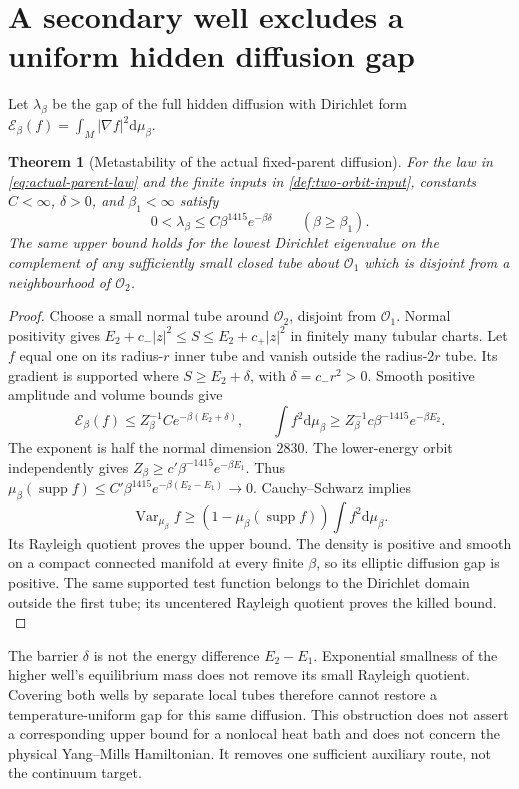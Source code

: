 \documentclass[11pt,oneside,openany]{book}
\newtheorem{theorem}{Theorem}[chapter]
\theoremstyle{definition}
\theoremstyle{remark}
\newcommand{\dd}{\mathrm d}
\newcommand{\Var}{\operatorname{Var}}
\newcommand{\supp}{\operatorname{supp}}
\newcommand{\src}[2]{\cite[#2]{#1}}
\begin{document}
\section{A secondary well excludes a uniform hidden diffusion gap}
\label{sec:hidden-metastability}
Let $\lambda_\beta$ be the gap of the full hidden diffusion with
Dirichlet form
$\mathcal E_\beta(f)=\int_M|\nabla f|^2\dd\mu_\beta$.

\begin{theorem}[Metastability of the actual fixed-parent diffusion]
\label{thm:hidden-metastability}
For the law in \cref{eq:actual-parent-law} and the finite inputs in
\cref{def:two-orbit-input}, constants $C<\infty$, $\delta>0$, and
$\beta_1<\infty$ satisfy
\begin{equation}\label{eq:hidden-metastability}
 0<\lambda_\beta\le C\beta^{1415}e^{-\beta\delta}
                   \qquad(\beta\ge\beta_1).
\end{equation}
The same upper bound holds for the lowest Dirichlet eigenvalue on the
complement of any sufficiently small closed tube about $\mathcal O_1$
which is disjoint from a neighbourhood of $\mathcal O_2$.
\end{theorem}
\begin{proof}
Choose a small normal tube around $\mathcal O_2$, disjoint from
$\mathcal O_1$. Normal positivity gives
$E_2+c_-|z|^2\le S\le E_2+c_+|z|^2$ in finitely many tubular
charts. Let $f$ equal one on its radius-$r$ inner tube and vanish
outside the radius-$2r$ tube. Its gradient is supported where
$S\ge E_2+\delta$, with $\delta=c_-r^2>0$. Smooth positive amplitude
and volume bounds give
\[
 \mathcal E_\beta(f)\le Z_\beta^{-1}C e^{-\beta(E_2+\delta)},\qquad
 \int f^2\dd\mu_\beta\ge Z_\beta^{-1}c\beta^{-1415}e^{-\beta E_2}.
\]
The exponent is half the normal dimension $2830$. The lower-energy
orbit independently gives
$Z_\beta\ge c'\beta^{-1415}e^{-\beta E_1}$. Thus
$\mu_\beta(\supp f)\le C'\beta^{1415}e^{-\beta(E_2-E_1)}\to0$.
Cauchy--Schwarz implies
\[
 \Var_{\mu_\beta}f\ge(1-\mu_\beta(\supp f))\int f^2\dd\mu_\beta.
\]
Its Rayleigh quotient proves the upper bound. The density is positive
and smooth on a compact connected manifold at every finite $\beta$,
so its elliptic diffusion gap is positive. The same supported test
function belongs to the Dirichlet domain outside the first tube;
its uncentered Rayleigh quotient proves the killed bound.
\src{F13}{V8}
\end{proof}
The barrier $\delta$ is not the energy difference $E_2-E_1$.
Exponential smallness of the higher well's equilibrium mass does not
remove its small Rayleigh quotient. Covering both wells by separate
local tubes therefore cannot restore a temperature-uniform gap for
this same diffusion. This obstruction does not assert a corresponding
upper bound for a nonlocal heat bath and does not concern the physical
Yang--Mills Hamiltonian. It removes one sufficient auxiliary route,
not the continuum target.
\end{document}
